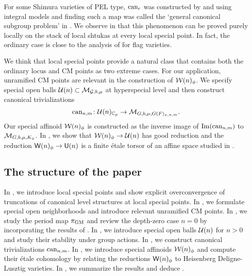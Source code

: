 \documentclass[12pt,reqno]{amsart}
\begin{document}
For some Shimura varieties of PEL type, ${\operatorname{can}}_r$ was constructed by \cite[Theorem A]{GK12} and \cite[Théorème 8]{Far11} using integral models and finding such a map was called the `general canonical subgroup problem' in \cite[Introduction]{GK12}. We observe in  that this phenomenon can be proved purely locally on the stack of local shtukas at every local special point. In fact, the ordinary case is close to the analysis of \cite{BP21} for flag varieties. 

We think that local special points provide a natural class that contains both the ordinary locus and CM points as two extreme cases. For our application, unramified CM points are relevant in the construction of ${\mathcal{W}}(n)_\phi$. We specify special open balls ${\mathcal{U}}(n) \subset {\mathcal{M}}_{{\mathcal{G}}, b, \mu}$ at hyperspecial level and then construct canonical trivializations
\[
    {\operatorname{can}}_{n, m} \colon {\mathcal{U}}(n)_{\mathbb{C}_p} \to {\mathcal{M}}_{G, b, \mu, G(F)_{x, n, m}}. 
\]
Our special affinoid ${\mathcal{W}}(n)_\phi$ is constructed as the inverse image of ${\operatorname{Im}}({\operatorname{can}}_{n, m})$ to ${\mathcal{M}}_{G, b, \mu, K_\phi}$. In , we show that ${\mathcal{W}}(n)_\phi \to {\mathcal{U}}(n)$ has good reduction and the reduction ${\mathsf{W}}(n)_\phi \to {\mathsf{U}}(n)$ is a finite \'{e}tale torsor of an affine space studied in \cite{Tak26_Yu}. 


\subsection*{The structure of the paper}

In , we introduce local special points and show explicit overconvergence of truncations of canonical level structures at local special points. In , we formulate special open neighborhoods and introduce relevant unramified CM points. In , we study the period map $\pi_{\operatorname{GM}}$ and review the depth-zero case $n = 0$ by incorporating the results of \cite{Tak25z}. In , we introduce special open balls ${\mathcal{U}}(n)$ for $n > 0$ and study their stability under group actions. In , we construct canonical trivializations ${\operatorname{can}}_{n, m}$. In , we introduce special affinoids ${\mathcal{W}}(n)_\phi$ and compute their \'{e}tale cohomology by relating the reductions ${\mathsf{W}}(n)_\phi$ to Heisenberg Deligne-Lusztig varieties. In , we summarize the results and deduce . 
\end{document}
